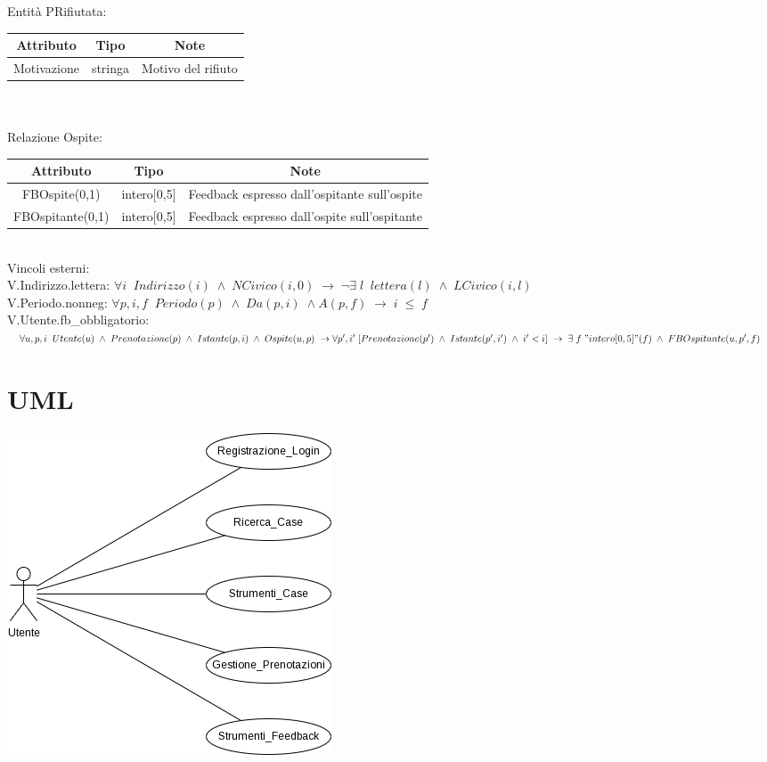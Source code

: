 \documentclass[a4paper,12pt]{report}
\begin{document}
      Entità PRifiutata: \\
      \begin{tabular}{|c|c|c|}
        \hline Attributo & Tipo & Note \\
        \hline Motivazione & stringa & Motivo del rifiuto \\
        \hline
      \end{tabular} \\
      \vspace{24pt} \\
      Relazione Ospite: \\
      \begin{tabular}{|c|c|c|}
        \hline Attributo & Tipo & Note \\
        \hline FBOspite(0,1) & intero[0,5] & Feedback espresso dall'ospitante sull'ospite \\
        \hline FBOspitante(0,1) & intero[0,5] & Feedback espresso dall'ospite sull'ospitante \\
        \hline
      \end{tabular} \\

      \vspace{24pt}
      \large Vincoli esterni: \\
      \normalsize
      V.Indirizzo.lettera: $\forall i \;\; Indirizzo(i) \; \wedge \; NCivico(i, 0) \; \rightarrow \; \neg \exists \; l \;\; lettera(l) \; \wedge \; LCivico(i, l)$ \\
      V.Periodo.nonneg: $\forall p,i,f \;\; Periodo(p) \; \wedge \; Da(p, i) \; \wedge A(p, f) \; \rightarrow \; i \; \leq \; f$ \\
      V.Utente.fb\_obbligatorio: $\forall u,p,i \;\; Utente(u) \; \wedge \; Prenotazione(p) \; \wedge \; Istante(p, i) \; \wedge \; Ospite(u, p) \; \rightarrow \forall p',i' \; [Prenotazione(p') \; \wedge \; Istante(p', i') \; \wedge \; i' < i] \; \rightarrow \; \exists \; f \; "intero[0,5]"(f) \; \wedge \; FBOspitante(u, p', f)$ \\
    \chapter{UML}
      \begin{center}
        \includegraphics{uml.png}
      \end{center}
\end{document}
